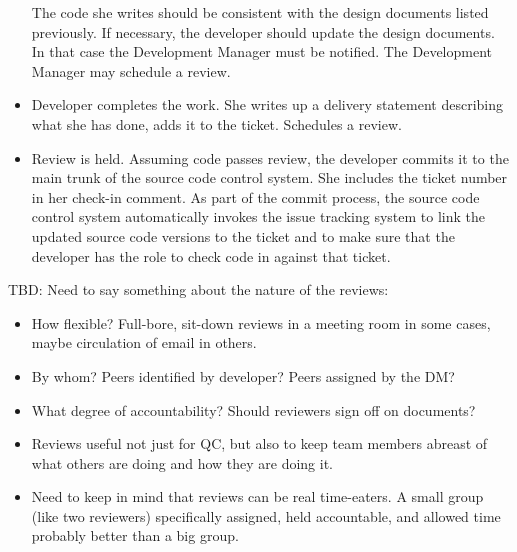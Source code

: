 \begin{itemize}
The code she writes should be consistent with the design
documents listed previously.  If necessary, the developer
should update the design documents.  In that case the
Development Manager must be notified.  The Development
Manager may schedule a review.
\item
Developer completes the work.  She writes up a delivery statement 
describing what she has done, adds it to the ticket.  Schedules a review.
\item
Review is held.  Assuming code passes review, the developer 
commits it to the main trunk of the source code control system.  
She includes the ticket number in her check-in comment.
As part of the commit process, the source code control system automatically 
invokes the issue tracking system to link the updated 
source code versions to the ticket  and to make 
sure that the developer has the role to check 
code in against that ticket.  
\end{itemize}

TBD:  Need to say something about the nature of the reviews:
\begin{itemize}
\item
How flexible?  Full-bore, sit-down reviews in a meeting
room in some cases, maybe circulation of email in others.
\item
By whom?  Peers identified by developer?  Peers assigned
by the DM?
\item
What degree of accountability?  Should reviewers sign
off on documents?
\item
Reviews useful not just for QC, but also to keep team
members abreast of what others are doing and how they are
doing it.
\item
Need to keep in mind that reviews can be real time-eaters.
A small group (like two reviewers) specifically assigned, 
held accountable, and 
allowed time probably better than a big group.  
\end{itemize}



